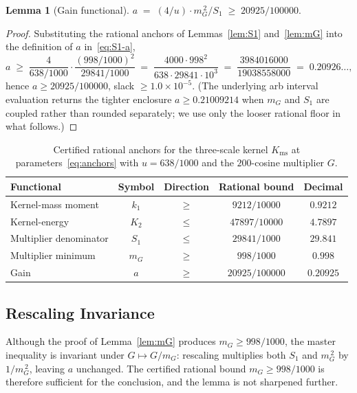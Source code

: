 \documentclass[11pt, letterpaper]{article}
\theoremstyle{paperplain}
\newtheorem{lemma}[theorem]{Lemma}
\theoremstyle{paperdef}
\newcommand{\Kms}{K_{\mathrm{ms}}}
\begin{document}
\begin{lemma}[Gain functional]
\label{lem:a}
\(
  a \;=\; (4/u)\cdot m_G^{\,2}/S_1 \;\ge\; 20925/100000.
\)
\end{lemma}

\begin{proof}
Substituting the rational anchors of
Lemmas~\ref{lem:S1} and~\ref{lem:mG} into the definition of $a$
in~\eqref{eq:S1-a},
\[
  a
  \;\ge\;
  \frac{4}{638/1000}\cdot\frac{(998/1000)^{2}}{29841/1000}
  \;=\;
  \frac{4000\cdot 998^{2}}{638\cdot 29841\cdot 10^{3}}
  \;=\;
  \frac{3984016000}{19038558000}
  \;=\; 0.20926\ldots,
\]
hence $a\ge 20925/100000$, slack $\ge 1.0\times 10^{-5}$.  (The
underlying arb interval evaluation returns the tighter enclosure
$a\ge 0.21009214$ when $m_G$ and $S_1$ are coupled rather than
rounded separately; we use only the looser rational floor in what
follows.)
\end{proof}

\begin{table}[ht]
\centering
\begin{tabular}{lcccc}
  \toprule
  Functional & Symbol & Direction & Rational bound & Decimal \\
  \midrule
  Kernel-mass moment   & $k_1$ & $\ge$ & $9212/10000$    & $0.9212$ \\
  Kernel-energy        & $K_2$ & $\le$ & $47897/10000$   & $4.7897$ \\
  Multiplier denominator & $S_1$ & $\le$ & $29841/1000$  & $29.841$ \\
  Multiplier minimum   & $m_G$ & $\ge$ & $998/1000$      & $0.998$  \\
  Gain                 & $a$   & $\ge$ & $20925/100000$  & $0.20925$ \\
  \bottomrule
\end{tabular}
\caption[Certified rational anchors for the three-scale kernel.]{Certified rational anchors for the three-scale kernel
$\Kms$ at parameters~\eqref{eq:anchors} with $u=638/1000$ and the
$200$-cosine multiplier $G$.}
\label{tab:anchors}
\end{table}

\subsection{Rescaling Invariance}\label{subsec:cert-rescaling}

Although the proof of Lemma~\ref{lem:mG}
produces $m_G\ge 998/1000$, the master inequality is invariant
under $G\mapsto G/m_G$: rescaling multiplies both $S_1$ and $m_G^{\,2}$
by $1/m_G^{\,2}$, leaving $a$ unchanged.  The certified rational
bound $m_G\ge 998/1000$ is therefore sufficient for the conclusion,
and the lemma is not sharpened further.
\end{document}
